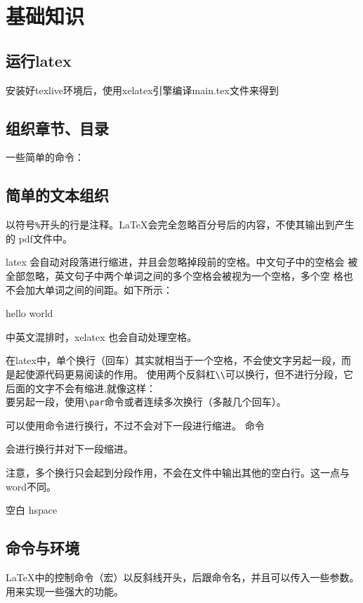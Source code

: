 \documentclass[supercite,fontset=windows]{../../upcthesis}
\begin{document}
\section{基础知识}
\subsection{运行latex}
安装好texlive环境后，使用xelatex引擎编译main.tex文件来得到
\subsection{组织章节、目录}
一些简单的命令：



\subsection{简单的文本组织}

以符号\verb|%|开头的行是注释。LaTeX会完全忽略百分号后的内容，不使其输出到产生的
pdf文件中。


latex 会自动对段落进行缩进，并且会忽略掉段前的空格。中文句子中的空格会
被全部忽略，英文句子中两个单词之间的多个空格会被视为一个空格，多个空
格也不会加大单词之间的间距。如下所示：

hello         world

中英文混排时，xelatex 也会自动处理空格。

在latex中，单个换行（回车）其实就相当于一个空格，不会使文字另起一段，而是起使源代码更易阅读的作用。
使用两个反斜杠\verb|\\|可以换行，但不进行分段，它后面的文字不会有缩进,就像这样：\\
要另起一段，使用\verb|\par|命令或者连续多次换行（多敲几个回车）。

可以使用命令进行换行，不过不会对下一段进行缩进。
命令 \par 会进行换行并对下一段缩进。

注意，多个换行只会起到分段作用，不会在文件中输出其他的空白行。这一点与word不同。





空白
hspace





\subsection{命令与环境}


LaTeX中的控制命令（宏）以反斜线开头，后跟命令名，并且可以传入一些参数。
用来实现一些强大的功能。
\end{document}
